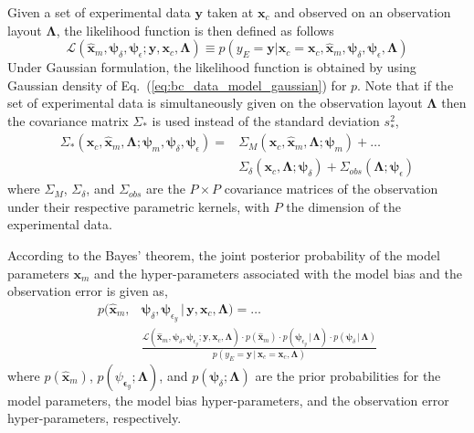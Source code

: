 Given a set of experimental data $\mathbf{y}$ taken at $\mathbf{x}_c$ and observed on an observation layout $\bm{\Lambda}$,
the likelihood function is then defined as follows
\begin{equation}
  \mathcal{L}(\hat{\bm{x}}_m, \bm{\psi}_\delta, \bm{\psi}_\epsilon; \mathbf{y}, \mathbf{x}_c, \bm{\Lambda}) \equiv p(y_E = \mathbf{y} | \bm{x}_c = \mathbf{x}_c, \hat{\bm{x}}_m, \bm{\psi}_\delta, \bm{\psi}_{\epsilon}, \bm{\Lambda})
\label{eq:bc_likelihood}
\end{equation}
Under Gaussian formulation, the likelihood function is obtained by using Gaussian density of Eq.~(\ref{eq:bc_data_model_gaussian}) for $p$.
Note that if the set of experimental data is simultaneously given on the observation layout $\bm{\Lambda}$ then the covariance matrix $\Sigma_*$ is used instead of the standard deviation $s^2_*$,
\begin{equation}
	\begin{split}
	\Sigma_*(\bm{x}_c, \hat{\bm{x}}_m, \bm{\Lambda}; \bm{\psi}_m, \bm{\psi}_\delta, \bm{\psi}_\epsilon) = & \Sigma_M(\bm{x}_c, \hat{\bm{x}}_m, \bm{\Lambda}; \bm{\psi}_{m}) + \ldots \\ 
	& \Sigma_\delta(\bm{x}_c, \bm{\Lambda}; \bm{\psi}_\delta) + \Sigma_{obs}(\bm{\Lambda}; \bm{\psi}_\epsilon)
	\end{split}
\label{eq:bc_gaussian_covariance_matrix}
\end{equation}
where $\Sigma_M$, $\Sigma_\delta$, and $\Sigma_{obs}$ are the $P \times P$ covariance matrices of the observation under their respective parametric kernels, with $P$ the dimension of the experimental data.

According to the Bayes' theorem, the joint posterior probability of the model parameters $\bm{x}_m$ and
the hyper-parameters associated with the model bias and the observation error is given as, 
\begin{equation}
	\begin{split}
  p(\hat{\bm{x}}_m, & \bm{\psi}_\delta, \bm{\psi}_{\epsilon_y}\,|\,\mathbf{y}, \mathbf{x}_c, \bm{\Lambda}) = \ldots \\
	& \frac{\mathcal{L}(\hat{\bm{x}}_m, \bm{\psi}_\delta, \bm{\psi}_{\epsilon_y} ; \mathbf{y}, \mathbf{x}_c, \bm{\Lambda}) \cdot p(\hat{\bm{x}}_m) \cdot p(\bm{\psi}_{\epsilon_y}\,|\,\bm{\Lambda}) \cdot p(\bm{\psi}_{\delta}\,|\,\bm{\Lambda})}{p(y_E = \mathbf{y}\,|\,\bm{x}_c = \mathbf{x}_c , \bm{\Lambda})}
	\end{split}
\label{eq:bc_joint_posterior}
\end{equation}
where $p(\hat{\bm{x}}_m)$, $p(\psi_{\bm{\epsilon}_y}; \bm{\Lambda})$, and $p(\bm{\psi}_{\delta}; \bm{\Lambda})$ are the prior probabilities for the model parameters, the model bias hyper-parameters, and the observation error hyper-parameters, respectively.

